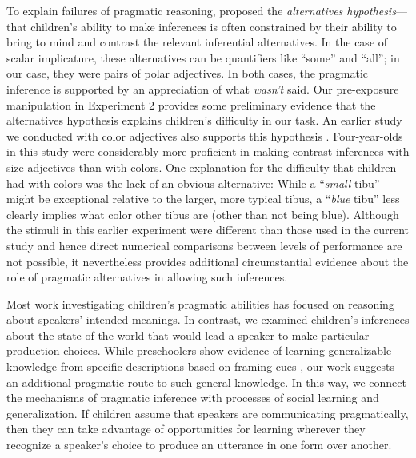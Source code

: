\documentclass[man]{apa2}
\begin{document}
To explain failures of pragmatic reasoning,  proposed the \emph{alternatives hypothesis}---that children's ability to make inferences is often constrained by their ability to bring to mind and contrast the relevant inferential alternatives. In the case of scalar implicature, these alternatives can be quantifiers like ``some'' and ``all''; in our case, they were pairs of polar adjectives. In both cases, the pragmatic inference is supported by an appreciation of what \emph{wasn't} said. Our pre-exposure manipulation in Experiment 2 provides some preliminary evidence that the alternatives hypothesis explains children's difficulty in our task. An earlier study we conducted with color adjectives also supports this hypothesis \cite{horowitz2012}. Four-year-olds in this study were considerably more proficient in making contrast inferences with size adjectives than with colors. One explanation for the difficulty that children had with colors was the lack of an obvious alternative: While a ``\emph{small} tibu'' might be exceptional relative to the larger, more typical tibus, a ``\emph{blue} tibu'' less clearly implies what color other tibus are (other than not being blue). Although the stimuli in this earlier experiment were different than those used in the current study and hence direct numerical comparisons between levels of performance are not possible, it nevertheless provides additional circumstantial evidence about the role of pragmatic alternatives in allowing such inferences. 

Most work investigating children's pragmatic abilities has focused on reasoning about speakers' intended meanings. In contrast, we examined children's inferences about the state of the world that would lead a speaker to make particular production choices. While preschoolers show evidence of learning generalizable knowledge from specific descriptions based on framing cues \cite{cimpian2009}, our work suggests an additional pragmatic route to such general knowledge. In this way, we connect the mechanisms of pragmatic inference with processes of social learning and generalization. If children assume that speakers are communicating pragmatically, then they can take advantage of opportunities for learning wherever they recognize a speaker's choice to produce an utterance in one form over another. 



\end{document}
